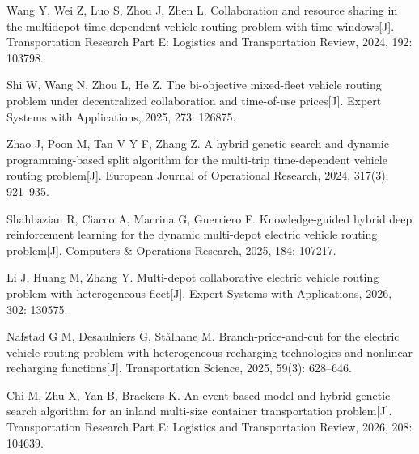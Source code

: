  Wang Y, Wei Z, Luo S, Zhou J, Zhen L.
Collaboration and resource sharing in the multidepot time-dependent
vehicle routing problem with time windows[J].
Transportation Research Part E: Logistics and Transportation Review,
2024, 192: 103798.

 Shi W, Wang N, Zhou L, He Z.
The bi-objective mixed-fleet vehicle routing problem under decentralized
collaboration and time-of-use prices[J].
Expert Systems with Applications, 2025, 273: 126875.

 Zhao J, Poon M, Tan V Y F, Zhang Z.
A hybrid genetic search and dynamic programming-based split algorithm
for the multi-trip time-dependent vehicle routing problem[J].
European Journal of Operational Research, 2024, 317(3): 921--935.

 Shahbazian R, Ciacco A, Macrina G, Guerriero F.
Knowledge-guided hybrid deep reinforcement learning for the dynamic
multi-depot electric vehicle routing problem[J].
Computers \& Operations Research, 2025, 184: 107217.

 Li J, Huang M, Zhang Y.
Multi-depot collaborative electric vehicle routing problem with
heterogeneous fleet[J].
Expert Systems with Applications, 2026, 302: 130575.

 Nafstad G M, Desaulniers G, St{\aa}lhane M.
Branch-price-and-cut for the electric vehicle routing problem with
heterogeneous recharging technologies and nonlinear recharging
functions[J]. Transportation Science, 2025, 59(3): 628--646.

 Chi M, Zhu X, Yan B, Braekers K.
An event-based model and hybrid genetic search algorithm for an inland
multi-size container transportation problem[J].
Transportation Research Part E: Logistics and Transportation Review,
2026, 208: 104639.
